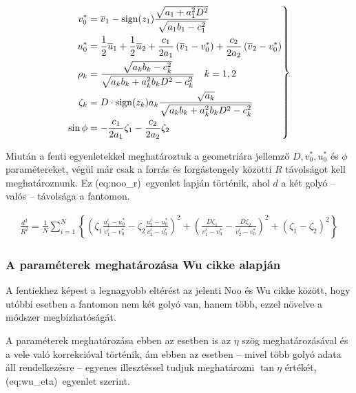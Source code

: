 \documentclass[a4paper,12pt,twoside]{article}
\begin{document}
\begin{equation}
\label{eq:noo_tobbi}
\left.
\begin{split}
v_0^* &= \overline{v}_1 - \text{sign} (z_1) \frac {\sqrt{a_1 + a_1^2D^2    }}{\sqrt{a_1b_1-c_1^2}}\\
u_0^* &= \frac{1}{2} \overline{u}_1  + \frac{1}{2} \overline{u}_2 + \frac{c_1}{2a_1} \left ( \overline{v}_1 - v_0^* \right) + \frac{c_2}{2a_2} \left (\overline{v}_2 - v_0^* \right)\\
\rho_k &= \frac{\sqrt{a_kb_k-c_k^2}}{\sqrt{a_kb_k+a_k^2b_kD^2-c_k^2}}  \hskip10pt k = 1,2\\
\zeta_k &= D \cdot \text{sign}(z_k)a_k \frac{\sqrt{a_k}}{\sqrt{a_kb_k+a_k^2b_kD^2-c_k^2}}\\
\sin \phi & = -\frac{c_1}{2a_1}  \zeta_1 - \frac{c_2}{2a_2} \zeta_2
\end{split}
\right \}
\end{equation}


Miután a fenti egyenletekkel meghatároztuk a geometriára jellemző $D, v_0^*, u_0^*$ és $\phi$ paramétereket, végül már csak a forrás és forgástengely közötti $R$ távolságot kell meghatároznunk. Ez \aref({eq:noo_r})~egyenlet lapján történik, ahol $d$ a két golyó -- valós -- távolsága a fantomon.

\begin{equation}
\label{eq:noo_r}
\begin{split}
\frac{d^2}{R^2} = \frac{1}{N} \sum_{i=1}^{N} \left\{ \left ( \zeta_1 \frac{u_1^i - u_0^*}{v_1^i - v_0^*}  - \zeta_2 \frac{u_2^i - u_0^*}{v_2^i - v_0^*} \right)^2 + \left( \frac{D \zeta_1}{v_1^i - v_0^*} - \frac{D \zeta_2}{v_2^i - v_0^*} \right)^2 + \left ( \zeta_1 - \zeta_2 \right) ^2 \right\}
\end{split}
\end{equation}


\subsubsection{A paraméterek meghatározása Wu\cite{wu} cikke alapján}


A fentiekhez képest a legnagyobb eltérést az jelenti Noo és Wu cikke között, hogy utóbbi esetben a fantomon nem két golyó van, hanem több, ezzel növelve a módszer megbízhatóságát. 

A paraméterek meghatározása ebben az esetben is az $\eta$ szög meghatározásával és a vele való korrekcióval történik, ám ebben az esetben -- mivel több golyó adata áll rendelkezésre -- egyenes illesztéssel tudjuk meghatározni $\tan \eta$ értékét, \aref({eq:wu_eta})~egyenlet szerint.
\end{document}
